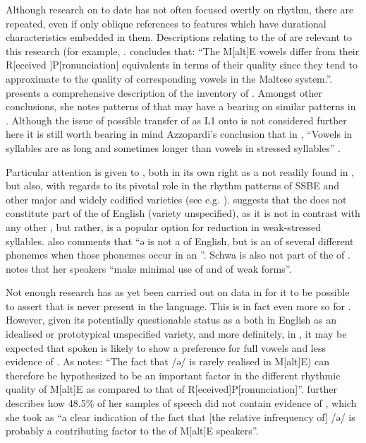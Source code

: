 \documentclass[output=paper]{langsci/langscibook}
\begin{document}
Although research on  to date has not often focused overtly on rhythm, there are repeated, even if only oblique references to features which have durational characteristics embedded in them. Descriptions relating to the  of  are relevant to this research (for example, \citep{Vella1995, Debrincat1999, Bonnici2010}. \citet[74]{Vella1995} concludes that: “The M[alt]E vowels differ from their R[eceived ]P[ronunciation] equivalents in terms of their quality since they tend to approximate to the quality of corresponding vowels in the Maltese system.”. \citet{Azzopardi1981} presents a comprehensive description of the  inventory of . Amongst other conclusions, she notes patterns of  that may have a bearing on similar patterns in . Although the issue of possible transfer of  as L1 onto  is not considered further here it is still worth bearing in mind Azzopardi's conclusion that in , “Vowels in  syllables are as long and sometimes longer than vowels in stressed syllables” \citep[120]{Azzopardi1981}. 

Particular attention is given to , both in its own right as a  not readily found in , but also, with regards to its pivotal role in the rhythm patterns of SSBE and other major and widely codified varieties (see e.g. \citealt{Deterding2001}). \citet{Giegerich1992} suggests that the   does not constitute part of the  of English (variety unspecified), as it is not in contrast with any other , but rather, is a popular option for reduction in weak-stressed syllables. \citet[102]{Roach2009} also comments that “ə is not a  of English, but is an  of several different  phonemes when those phonemes occur in an  ”. Schwa is also not part of the  of  \citep{Azzopardi1981,BorgAzzopardi-Alexander1997}. \citet[90]{Calleja1987} notes that her  speakers “make minimal use of  and of weak forms”.

Not enough research has as yet been carried out on  data in  for it to be possible to assert that  is never present in the language. This is in fact even more so for . However, given its potentially questionable status as a  both in English as an idealised or prototypical unspecified variety, and more definitely, in , it may be expected that spoken  is likely to show a preference for full vowels and less evidence of . As \citet[75]{Vella1995} notes: “The fact that /ə/ is rarely realised in M[alt]E) can therefore be hypothesized to be an important factor in the different rhythmic quality of M[alt]E as compared to that of R[eceived]P[ronunciation]”. \citet[70]{Debrincat1999} further describes how 48.5\% of her samples of  speech did not contain evidence of , which she took as “a clear indication of the fact that [the relative infrequency of] /ə/ is probably a contributing factor to the  of M[alt]E speakers”. 
\end{document}

